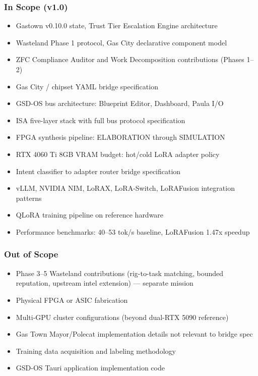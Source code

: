 \documentclass[11pt,letterpaper]{article}
\begin{document}
\subsubsection{In Scope (v1.0)}
\begin{itemize}
  \item Gastown v0.10.0 state, Trust Tier Escalation Engine architecture
  \item Wasteland Phase 1 protocol, Gas City declarative component model
  \item ZFC Compliance Auditor and Work Decomposition contributions (Phases 1--2)
  \item Gas City / chipset YAML bridge specification
  \item GSD-OS bus architecture: Blueprint Editor, Dashboard, Paula I/O
  \item ISA five-layer stack with full bus protocol specification
  \item FPGA synthesis pipeline: ELABORATION through SIMULATION
  \item RTX 4060 Ti 8GB VRAM budget: hot/cold LoRA adapter policy
  \item Intent classifier to adapter router bridge specification
  \item vLLM, NVIDIA NIM, LoRAX, LoRA-Switch, LoRAFusion integration patterns
  \item QLoRA training pipeline on reference hardware
  \item Performance benchmarks: 40--53 tok/s baseline, LoRAFusion 1.47x speedup
\end{itemize}

\subsubsection{Out of Scope}
\begin{itemize}
  \item Phase 3--5 Wasteland contributions (rig-to-task matching, bounded reputation, upstream intel extension) --- separate mission
  \item Physical FPGA or ASIC fabrication
  \item Multi-GPU cluster configurations (beyond dual-RTX 5090 reference)
  \item Gas Town Mayor/Polecat implementation details not relevant to bridge spec
  \item Training data acquisition and labeling methodology
  \item GSD-OS Tauri application implementation code
\end{itemize}
\end{document}
